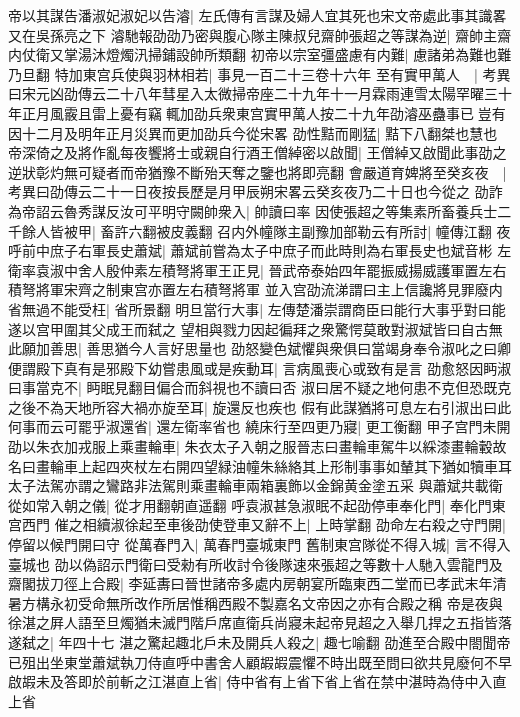 帝以其謀告潘淑妃淑妃以告濬|{
	左氏傳有言謀及婦人宜其死也宋文帝處此事其識畧又在吳孫亮之下}
濬馳報劭劭乃密與腹心隊主陳叔兒齋帥張超之等謀為逆|{
	齋帥主齋内仗衛又掌湯沐燈燭汛掃鋪設帥所類翻}
初帝以宗室彊盛慮有内難|{
	慮諸弟為難也難乃旦翻}
特加東宫兵使與羽林相若|{
	事見一百二十三卷十六年}
至有實甲萬人　|{
	考異曰宋元凶劭傳云二十八年彗星入太微掃帝座二十九年十一月霖雨連雪太陽罕曜三十年正月風霰且雷上憂有竊輒加劭兵衆東宫實甲萬人按二十九年劭濬巫蠱事已豈有因十二月及明年正月災異而更加劭兵今從宋畧}
劭性黠而剛猛|{
	黠下八翻桀也慧也}
帝深倚之及將作亂每夜饗將士或親自行酒王僧綽密以啟聞|{
	王僧綽又啟聞此事劭之逆狀彰灼無可疑者而帝猶豫不斷殆天奪之鑒也將即亮翻}
會嚴道育婢將至癸亥夜　|{
	考異曰劭傳云二十一日夜按長歷是月甲辰朔宋畧云癸亥夜乃二十日也今從之}
劭詐為帝詔云魯秀謀反汝可平明守闕帥衆入|{
	帥讀曰率}
因使張超之等集素所畜養兵士二千餘人皆被甲|{
	畜許六翻被皮義翻}
召内外幢隊主副豫加部勒云有所討|{
	幢傳江翻}
夜呼前中庶子右軍長史蕭斌|{
	蕭斌前嘗為太子中庶子而此時則為右軍長史也斌音彬}
左衛率袁淑中舍人殷仲素左積弩將軍王正見|{
	晉武帝泰始四年罷振威揚威護軍置左右積弩將軍宋齊之制東宫亦置左右積弩將軍}
並入宫劭流涕謂曰主上信讒將見罪廢内省無過不能受枉|{
	省所景翻}
明旦當行大事|{
	左傳楚潘崇謂商臣曰能行大事乎對曰能遂以宫甲圍其父成王而弑之}
望相與戮力因起徧拜之衆驚愕莫敢對淑斌皆曰自古無此願加善思|{
	善思猶今人言好思量也}
劭怒變色斌懼與衆俱曰當竭身奉令淑叱之曰卿便謂殿下真有是邪殿下幼嘗患風或是疾動耳|{
	言病風喪心或致有是言}
劭愈怒因眄淑曰事當克不|{
	眄眠見翻目偏合而斜視也不讀曰否}
淑曰居不疑之地何患不克但恐既克之後不為天地所容大禍亦旋至耳|{
	旋還反也疾也}
假有此謀猶將可息左右引淑出曰此何事而云可罷乎淑還省|{
	還左衛率省也}
繞床行至四更乃寢|{
	更工衡翻}
甲子宫門未開劭以朱衣加戎服上乘畫輪車|{
	朱衣太子入朝之服晉志曰畫輪車駕牛以綵漆畫輪轂故名曰畫輪車上起四夾杖左右開四望緑油幢朱絲絡其上形制事事如輦其下猶如犢車耳太子法駕亦謂之鸞路非法駕則乘畫輪車兩箱裏飾以金錦黄金塗五采}
與蕭斌共載衛從如常入朝之儀|{
	從才用翻朝直遥翻}
呼袁淑甚急淑眠不起劭停車奉化門|{
	奉化門東宫西門}
催之相續淑徐起至車後劭使登車又辭不上|{
	上時掌翻}
劭命左右殺之守門開|{
	停留以候門開曰守}
從萬春門入|{
	萬春門臺城東門}
舊制東宫隊從不得入城|{
	言不得入臺城也}
劭以偽詔示門衛曰受勑有所收討令後隊速來張超之等數十人馳入雲龍門及齋閣拔刀徑上合殿|{
	李延夀曰晉世諸帝多處内房朝宴所臨東西二堂而已孝武末年清暑方構永初受命無所改作所居惟稱西殿不製嘉名文帝因之亦有合殿之稱}
帝是夜與徐湛之屛人語至旦燭猶未滅門階戶席直衛兵尚寢未起帝見超之入舉几捍之五指皆落遂弑之|{
	年四十七}
湛之驚起趣北戶未及開兵人殺之|{
	趣七喻翻}
劭進至合殿中閤聞帝已殂出坐東堂蕭斌執刀侍直呼中書舍人顧嘏嘏震懼不時出既至問曰欲共見廢何不早啟嘏未及答即於前斬之江湛直上省|{
	侍中省有上省下省上省在禁中湛時為侍中入直上省}
